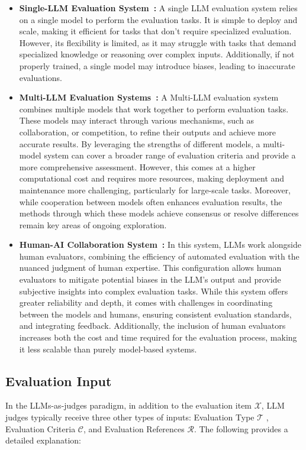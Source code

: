 \begin{itemize}[leftmargin=*]
    \item \textbf{Single-LLM Evaluation System~\cite{lin2023llm,zhang2024talec,liu2023g}: } A single LLM evaluation system relies on a single model to perform the evaluation tasks.  It is simple to deploy and scale, making it efficient for tasks that don't require specialized evaluation. However, its flexibility is limited, as it may struggle with tasks that demand specialized knowledge or reasoning over complex inputs. Additionally, if not properly trained, a single model may introduce biases, leading to inaccurate evaluations.
    \item \textbf{Multi-LLM Evaluation Systems~\cite{chu2024pre,chan2023chateval,li2023prd}: } A Multi-LLM evaluation system combines multiple models that work together to perform evaluation tasks.  These models may interact through various mechanisms, such as collaboration, or competition, to refine their outputs and achieve more accurate results. By leveraging the strengths of different models, a multi-model system can cover a broader range of evaluation criteria and provide a more comprehensive assessment. However, this comes at a higher computational cost and requires more resources, making deployment and maintenance more challenging, particularly for large-scale tasks. 
    Moreover, while cooperation between models often enhances evaluation results, the methods through which these models achieve consensus or resolve differences remain key areas of ongoing exploration.
    \item \textbf{Human-AI Collaboration System~\cite{li2023collaborative,wang2023large,shankar2024validates}: } In this system, LLMs work alongside human evaluators, combining the efficiency of automated evaluation with the nuanced judgment of human expertise. This configuration allows human evaluators to mitigate potential biases in the LLM's output and provide subjective insights into complex evaluation tasks. While this system offers greater reliability and depth, it comes with challenges in coordinating between the models and humans, ensuring consistent evaluation standards, and integrating feedback. Additionally, the inclusion of human evaluators increases both the cost and time required for the evaluation process, making it less scalable than purely model-based systems.
\end{itemize}



\subsection{Evaluation Input}
In the LLMs-as-judges paradigm, in addition to the evaluation item $\mathcal{X}$, LLM judges typically receive three other types of inputs: Evaluation Type $\mathcal{T}$ , Evaluation Criteria $\mathcal{C}$, and Evaluation References $\mathcal{R}$. The following provides a detailed explanation:


